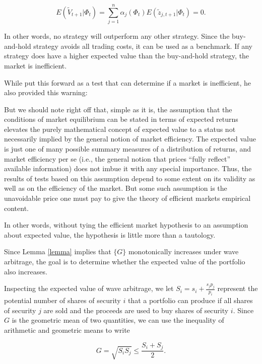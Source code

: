 \documentclass{article}
\begin{document}
\begin{equation}
\label{eq:excess_returns}
  E(\tilde{V}_{t+1} | \Phi_t)
    = \sum_{j=1}^n \alpha_j (\Phi_t) E(\tilde{z}_{j,t+1} | \Phi_t)
    = 0.
\end{equation}

In other words, no strategy will outperform any other strategy. Since the
buy-and-hold strategy avoids all trading costs, it can be used as a benchmark.
If any strategy does have a higher expected value than the buy-and-hold
strategy, the market is inefficient.

While \citet{fama1970} put this forward as a test that can determine if a
market is inefficient, he also provided this warning:

\begin{displayquote}
  But we should note right off that, simple as it is, the assumption that the
  conditions of market equilibrium can be stated in terms of expected returns
  elevates the purely mathematical concept of expected value to a status not
  necessarily implied by the general notion of market efficiency. The expected
  value is just one of many possible summary measures of a distribution of
  returns, and market efficiency per se (i.e., the general notion that prices
  ``fully reflect'' available information) does not imbue it with any special
  importance. Thus, the results of tests based on this assumption depend to
  some extent on its validity as well as on the efficiency of the market. But
  some such assumption is the unavoidable price one must pay to give the theory
  of efficient markets empirical content.
\end{displayquote}

In other words, without tying the efficient market hypothesis to an assumption
about expected value, the hypothesis is little more than a tautology.

Since Lemma \ref{lemma} implies that $\{G\}$ monotonically increases under wave
arbitrage, the goal is to determine whether the expected value of the portfolio
also increases.

Inspecting the expected value of wave arbitrage, we let
$S_i = s_i + \frac{s_j p_j}{p_i}$ represent the potential number of shares of
security $i$ that a portfolio can produce if all shares of security $j$ are sold
and the proceeds are used to buy shares of security $i$. Since $G$ is the
geometric mean of two quantities, we can use the inequality of arithmetic and
geometric means to write

\begin{equation}
  G = \sqrt{S_i S_j} \leq \frac{S_i + S_j}{2}.
\end{equation}
\end{document}
